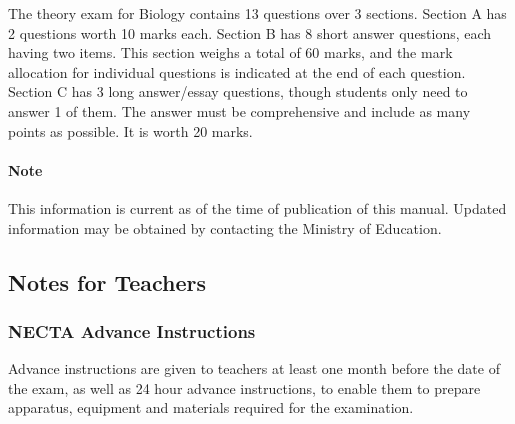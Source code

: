 The theory exam for Biology contains 13 questions over 3 sections. Section A has 2 questions worth 10 marks each.  Section B has 8 short answer questions, each having two items. This section weighs a total of 60 marks, and the mark allocation for individual questions is indicated at the end of each question. Section C has 3 long answer\slash essay questions, though students only need to answer 1 of them. The answer must be comprehensive and include as many points as possible. It is worth 20 marks.

\paragraph{Note} This information is current as of the time of publication of this manual. Updated information may be obtained by contacting the Ministry of Education. 

\subsection{Notes for Teachers}

\subsubsection{NECTA Advance Instructions}
Advance instructions are given to teachers at least one month before the date of the exam, as well as 24 hour advance instructions, to enable them to prepare apparatus, equipment and materials required for the examination.




